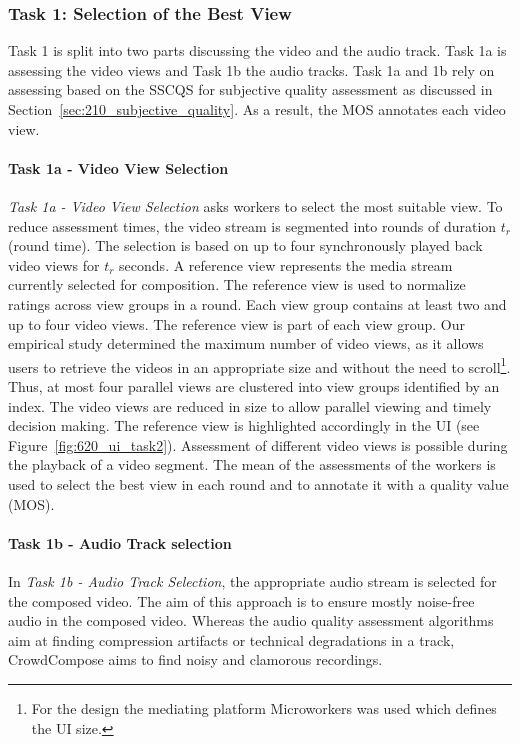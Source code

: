 \subsubsection{Task 1: Selection of the Best View}
Task 1 is split into two parts discussing the video and the audio track.
Task 1a is assessing the video views and Task 1b the audio tracks. 
Task 1a and 1b rely on assessing based on the \ac{SSCQS} for subjective quality assessment as discussed in Section~\ref{sec:210_subjective_quality}.
As a result, the \ac{MOS} annotates each video view.
\paragraph{Task 1a - Video View Selection}
\emph{Task 1a -  Video View Selection} asks workers to select the most suitable view.
To reduce assessment times, the video stream is segmented into rounds of duration $t_{r}$ (round time). 
The selection is based on up to four synchronously played back video views for $t_{r}$ seconds.
A reference view represents the media stream currently selected for composition.
The reference view is used to normalize ratings across view groups in a round. 
Each view group contains at least two and up to four video views.
The reference view is part of each view group.
Our empirical study determined the maximum number of video views, as it allows users to retrieve the videos in an appropriate size and without the need to scroll\footnote{For the design the mediating platform Microworkers was used which defines the UI size.}.
Thus, at most four parallel views are clustered into view groups identified by an index.
The video views are reduced in size to allow parallel viewing and timely decision making. 
The reference view is highlighted accordingly in the \ac{UI} (see Figure~\ref{fig:620_ui_task2}). 
Assessment of different video views is possible during the playback of a video segment.
The mean of the assessments of the workers is used to select the best view in each round and to annotate it with a quality value (\ac{MOS}).
\paragraph{Task 1b - Audio Track selection}
In \emph{Task 1b - Audio Track Selection}, the appropriate audio stream is selected for the composed video. 
The aim of this approach is to ensure mostly noise-free audio in the composed video. 
Whereas the audio quality assessment algorithms aim at finding compression artifacts or technical degradations in a track, CrowdCompose aims to find noisy and clamorous recordings.

